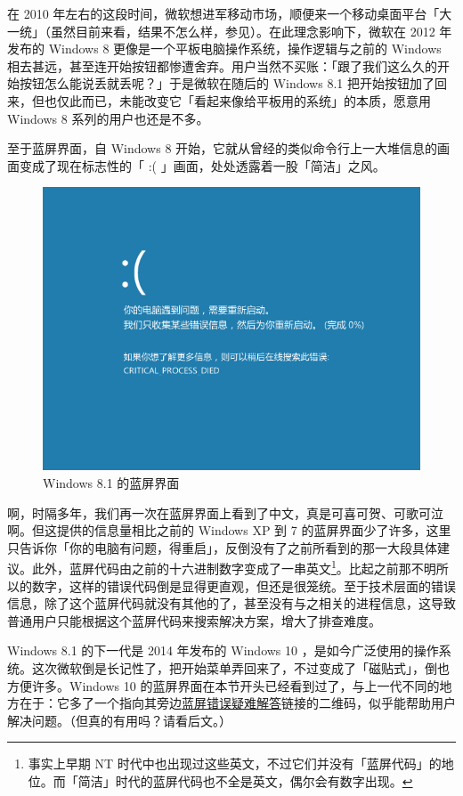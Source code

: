 在 2010 年左右的这段时间，微软想进军移动市场，顺便来一个移动桌面平台「大一统」（虽然目前来看，结果不怎么样，参见）。在此理念影响下，微软在 2012 年发布的 Windows 8 更像是一个平板电脑操作系统，操作逻辑与之前的 Windows 相去甚远，甚至连开始按钮都惨遭舍弃。用户当然不买账：「跟了我们这么久的开始按钮怎么能说丢就丢呢？」于是微软在随后的 Windows 8.1 把开始按钮加了回来，但也仅此而已，未能改变它「看起来像给平板用的系统」的本质，愿意用 Windows 8 系列的用户也还是不多。

至于蓝屏界面，自 Windows 8 开始，它就从曾经的类似命令行上一大堆信息的画面变成了现在标志性的「 :( 」画面，处处透露着一股「简洁」之风。

\begin{figure}[htb!]
  \centering
  \includegraphics[width=.65\textwidth]{assets/advanced/Win-8.1-BSoD.png}
  \caption{Windows 8.1 的蓝屏界面}
  \label{fig:Win-8.1-BSoD}
\end{figure}

啊，时隔多年，我们再一次在蓝屏界面上看到了中文，真是可喜可贺、可歌可泣啊。但这提供的信息量相比之前的 Windows XP 到 7 的蓝屏界面少了许多，这里只告诉你「你的电脑有问题，得重启」，反倒没有了之前所看到的那一大段具体建议。此外，蓝屏代码由之前的十六进制数字变成了一串英文\footnote{事实上早期 NT 时代中也出现过这些英文，不过它们并没有「蓝屏代码」的地位。而「简洁」时代的蓝屏代码也不全是英文，偶尔会有数字出现。}。比起之前那不明所以的数字，这样的错误代码倒是显得更直观，但还是很笼统。至于技术层面的错误信息，除了这个蓝屏代码就没有其他的了，甚至没有与之相关的进程信息，这导致普通用户只能根据这个蓝屏代码来搜索解决方案，增大了排查难度。

Windows 8.1 的下一代是 2014 年发布的 Windows 10 ，是如今广泛使用的操作系统。这次微软倒是长记性了，把开始菜单弄回来了，不过变成了「磁贴式」，倒也方便许多。Windows 10 的蓝屏界面在本节开头已经看到过了，与上一代不同的地方在于：它多了一个指向其旁边\href{https://www.windows.com/stopcode}{蓝屏错误疑难解答}链接的二维码，似乎能帮助用户解决问题。（但真的有用吗？请看后文。）

